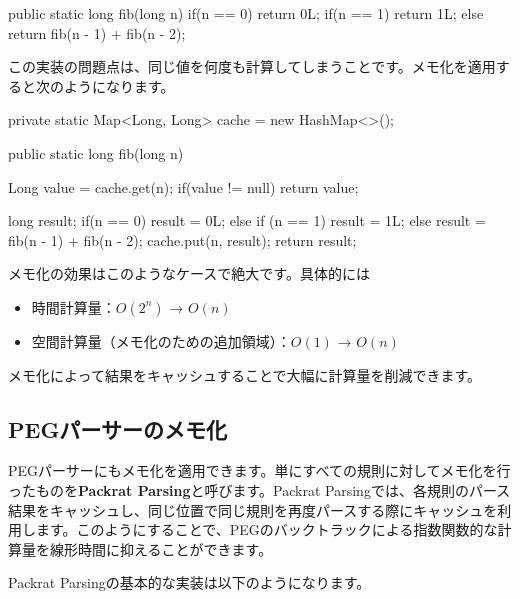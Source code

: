 \begin{codescreen}{}
public static long fib(long n) {
    if(n == 0) return 0L;
    if(n == 1) return 1L;
    else return fib(n - 1) + fib(n - 2); 
}
\end{codescreen}

この実装の問題点は、同じ値を何度も計算してしまうことです。メモ化を適用すると次のようになります。

\begin{codescreen}{}
private static Map<Long, Long> cache = new HashMap<>();

public static long fib(long n) {
    Long value = cache.get(n);
    if(value != null) return value;

    long result;
    if(n == 0) {
        result = 0L;
    } else if (n == 1) {
        result = 1L;
    } else {
        result = fib(n - 1) + fib(n - 2);
    }
    cache.put(n, result);
    return result;
}
\end{codescreen}

メモ化の効果はこのようなケースで絶大です。具体的には

\begin{itemize}
\item
  時間計算量：\(O(2^n)\) → \(O(n)\)
\item
  空間計算量（メモ化のための追加領域）：\(O(1)\) → \(O(n)\)
\end{itemize}

メモ化によって結果をキャッシュすることで大幅に計算量を削減できます。

\subsection{PEGパーサーのメモ化}

PEGパーサーにもメモ化を適用できます。単にすべての規則に対してメモ化を行ったものを\textbf{\sffamily Packrat
Parsing}と呼びます。Packrat
Parsingでは、各規則のパース結果をキャッシュし、同じ位置で同じ規則を再度パースする際にキャッシュを利用します。このようにすることで、PEGのバックトラックによる指数関数的な計算量を線形時間に抑えることができます。

Packrat Parsingの基本的な実装は以下のようになります。

